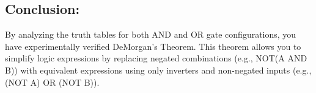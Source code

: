 \subsection*{Conclusion:}

\noindent By analyzing the truth tables for both AND and OR gate configurations, you have experimentally verified DeMorgan's Theorem. This theorem allows you to simplify logic expressions by replacing negated combinations (e.g., NOT(A AND B)) with equivalent expressions using only inverters and non-negated inputs (e.g., (NOT A) OR (NOT B)).

    

\newpage 
